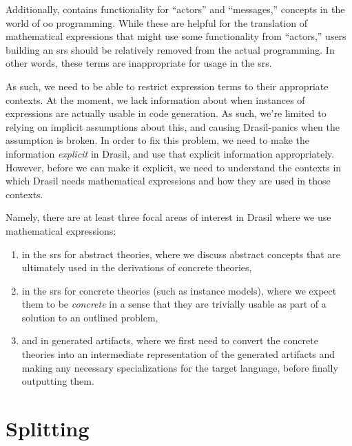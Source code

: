 Additionally, \Expr{} contains functionality for ``actors'' and ``messages,''
concepts in the world of \acs{oo} programming. While these are helpful for the
translation of mathematical expressions that might use some functionality from
``actors,'' users building an \acs{srs} should be relatively removed from the
actual programming. In other words, these terms are inappropriate for usage in
the \acs{srs}.

As such, we need to be able to restrict expression terms to their appropriate
contexts. At the moment, we lack information about when instances of expressions
are actually usable in code generation. As such, we're limited to relying on
implicit assumptions about this, and causing Drasil-panics when the assumption
is broken. In order to fix this problem, we need to make the information
\textit{explicit} in Drasil, and use that explicit information appropriately.
However, before we can make it explicit, we need to understand the contexts in
which Drasil needs mathematical expressions and how they are used in those
contexts.

Namely, there are at least three focal areas of interest in Drasil where we use
mathematical expressions:

\begin{enumerate}

    \item in the \acs{srs} for abstract theories, where we discuss abstract
          concepts that are ultimately used in the derivations of concrete
          theories,

    \item in the \acs{srs} for concrete theories (such as instance models),
          where we expect them to be \textit{concrete} in a sense that they are
          trivially usable as part of a solution to an outlined problem,

    \item and in generated artifacts, where we first need to convert the
          concrete theories into an intermediate representation of the generated
          artifacts and making any necessary specializations for the target
          language, before finally outputting them.

\end{enumerate}

\section{Splitting}
\label{chap:lang-division:sec:splitting}

